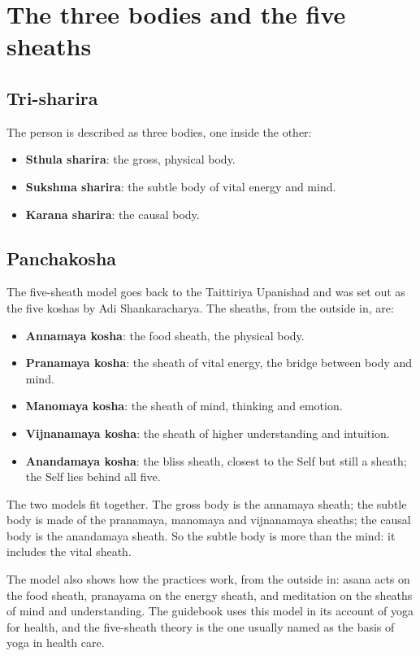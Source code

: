 \section{The three bodies and the five sheaths}

\subsection*{Tri-sharira}
The person is described as three bodies, one inside the other:
\begin{itemize}
\item \textbf{Sthula sharira}: the gross, physical body.
\item \textbf{Sukshma sharira}: the subtle body of vital energy and mind.
\item \textbf{Karana sharira}: the causal body.
\end{itemize}

\subsection*{Panchakosha}
The five-sheath model goes back to the Taittiriya Upanishad and was set out as the five koshas by Adi Shankaracharya. The sheaths, from the outside in, are:
\begin{itemize}
\item \textbf{Annamaya kosha}: the food sheath, the physical body.
\item \textbf{Pranamaya kosha}: the sheath of vital energy, the bridge between body and mind.
\item \textbf{Manomaya kosha}: the sheath of mind, thinking and emotion.
\item \textbf{Vijnanamaya kosha}: the sheath of higher understanding and intuition.
\item \textbf{Anandamaya kosha}: the bliss sheath, closest to the Self but still a sheath; the Self lies behind all five.
\end{itemize}

The two models fit together. The gross body is the annamaya sheath; the subtle body is made of the pranamaya, manomaya and vijnanamaya sheaths; the causal body is the anandamaya sheath. So the subtle body is more than the mind: it includes the vital sheath.

The model also shows how the practices work, from the outside in: asana acts on the food sheath, pranayama on the energy sheath, and meditation on the sheaths of mind and understanding. The guidebook uses this model in its account of yoga for health, and the five-sheath theory is the one usually named as the basis of yoga in health care.

